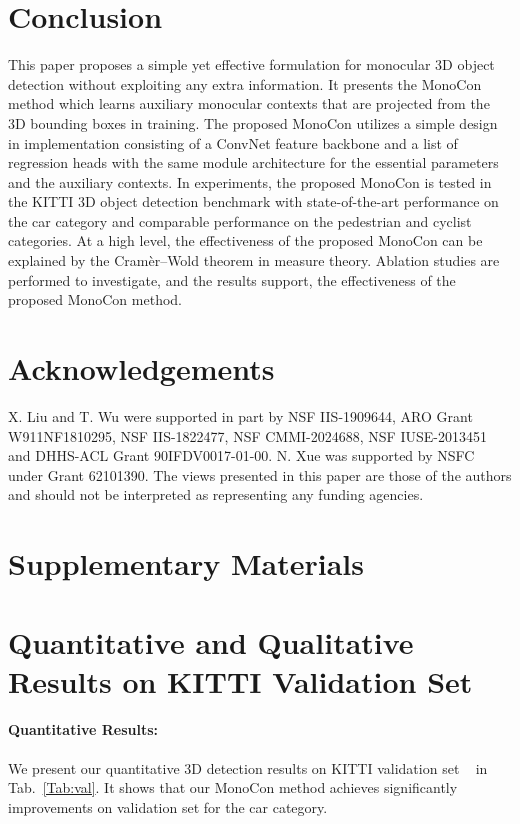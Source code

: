 \documentclass[letterpaper]{article} \usepackage{aaai22}  \usepackage{times}  \usepackage{helvet}  \usepackage{courier}  \usepackage[hyphens]{url}  \usepackage{graphicx} \urlstyle{rm} \def\UrlFont{\rm}  \usepackage{natbib}  \usepackage{caption} \DeclareCaptionStyle{ruled}{labelfont=normalfont,labelsep=colon,strut=off} \frenchspacing  \setlength{\pdfpagewidth}{8.5in}  \setlength{\pdfpageheight}{11in}  \usepackage{algorithm}
\begin{document}
\section{Conclusion}
This paper proposes a simple yet effective formulation for monocular 3D object detection without exploiting any extra information. It presents the MonoCon method which learns auxiliary monocular contexts that are projected from the 3D bounding boxes in training.  The proposed MonoCon utilizes a simple design in implementation consisting of a ConvNet feature backbone and a list of regression heads with the same module architecture for the essential parameters and the auxiliary contexts. In experiments, the proposed MonoCon is tested in the KITTI 3D object detection benchmark with state-of-the-art performance on the car category and comparable performance on the pedestrian and cyclist categories. At a high level, the effectiveness of the proposed MonoCon can be explained by the  Cram\`er–Wold theorem in measure theory. Ablation studies are performed to investigate, and the results support, the effectiveness of the proposed MonoCon method. 


\section*{Acknowledgements}
X. Liu and T. Wu were supported in part by NSF IIS-1909644, ARO Grant W911NF1810295, NSF IIS-1822477, NSF CMMI-2024688, NSF IUSE-2013451 and DHHS-ACL Grant 90IFDV0017-01-00. N. Xue was supported  by NSFC under Grant 62101390.
The views presented in this paper are those of the authors and should not be interpreted as representing any funding agencies.




\clearpage


\onecolumn
\section{Supplementary Materials}

\section{Quantitative and Qualitative Results on KITTI Validation Set}

\paragraph{Quantitative Results:} We present our quantitative 3D detection results on KITTI validation set ~\cite{mono3d} in Tab.~\ref{Tab:val}. It shows that our MonoCon method achieves significantly improvements on validation set for the car category.
\end{document}
